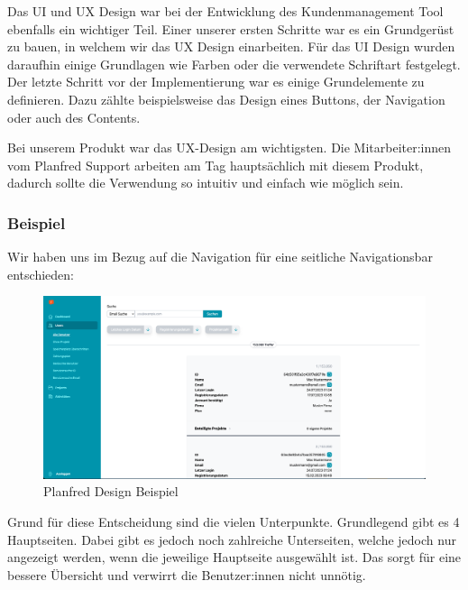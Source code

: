 Das UI und UX Design war bei der Entwicklung des Kundenmanagement Tool ebenfalls ein wichtiger Teil. Einer unserer ersten Schritte war es ein Grundgerüst zu bauen, in welchem wir das UX Design einarbeiten. Für das UI Design wurden daraufhin einige Grundlagen wie Farben oder die verwendete Schriftart festgelegt. Der letzte Schritt vor der Implementierung war es einige Grundelemente zu definieren. Dazu zählte beispielsweise das Design eines Buttons, der Navigation oder auch des Contents.

Bei unserem Produkt war das UX-Design am wichtigsten. Die Mitarbeiter:innen vom Planfred Support arbeiten am Tag hauptsächlich mit diesem Produkt, dadurch sollte die Verwendung so intuitiv und einfach wie möglich sein.

\subsubsection{Beispiel}
Wir haben uns im Bezug auf die Navigation für eine seitliche Navigationsbar entschieden:

\begin{figure}[h!]
    \centering
    \includegraphics[width=1\textwidth]{pics/planfred-ui-ux-example.png}
    \caption{Planfred Design Beispiel}
    \label{fig:mesh1}
\end{figure}

Grund für diese Entscheidung sind die vielen Unterpunkte. Grundlegend gibt es 4 Hauptseiten. Dabei gibt es jedoch noch zahlreiche Unterseiten, welche jedoch nur angezeigt werden, wenn die jeweilige Hauptseite ausgewählt ist. Das sorgt für eine bessere Übersicht und verwirrt die Benutzer:innen nicht unnötig. 